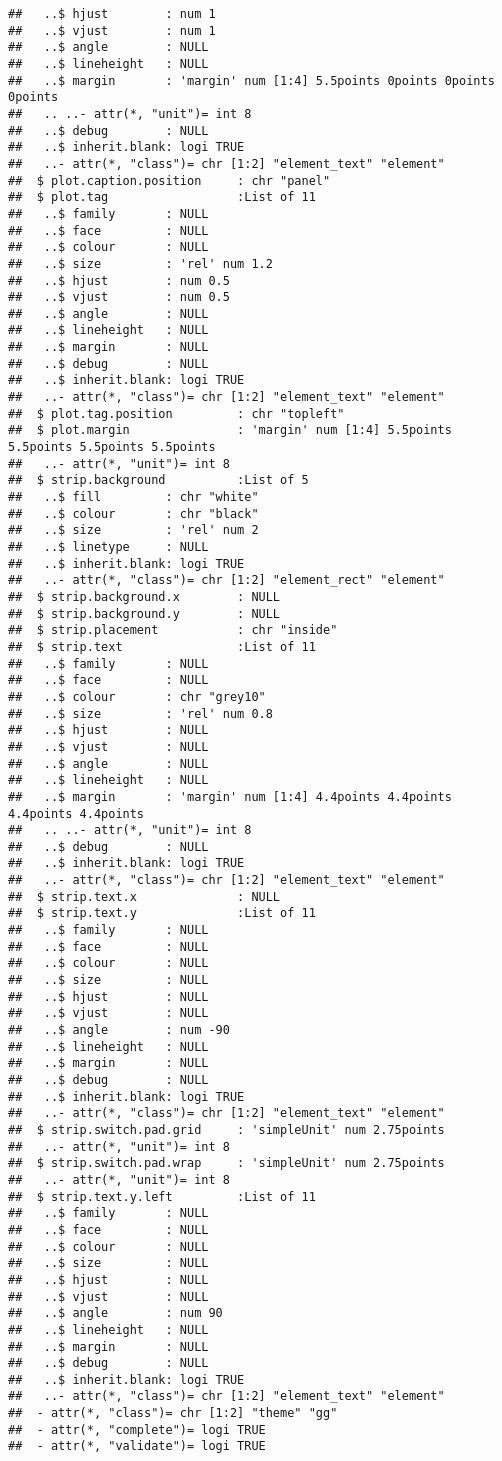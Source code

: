 \documentclass[
]{article}
\begin{document}
\begin{verbatim}
##   ..$ hjust        : num 1
##   ..$ vjust        : num 1
##   ..$ angle        : NULL
##   ..$ lineheight   : NULL
##   ..$ margin       : 'margin' num [1:4] 5.5points 0points 0points 0points
##   .. ..- attr(*, "unit")= int 8
##   ..$ debug        : NULL
##   ..$ inherit.blank: logi TRUE
##   ..- attr(*, "class")= chr [1:2] "element_text" "element"
##  $ plot.caption.position     : chr "panel"
##  $ plot.tag                  :List of 11
##   ..$ family       : NULL
##   ..$ face         : NULL
##   ..$ colour       : NULL
##   ..$ size         : 'rel' num 1.2
##   ..$ hjust        : num 0.5
##   ..$ vjust        : num 0.5
##   ..$ angle        : NULL
##   ..$ lineheight   : NULL
##   ..$ margin       : NULL
##   ..$ debug        : NULL
##   ..$ inherit.blank: logi TRUE
##   ..- attr(*, "class")= chr [1:2] "element_text" "element"
##  $ plot.tag.position         : chr "topleft"
##  $ plot.margin               : 'margin' num [1:4] 5.5points 5.5points 5.5points 5.5points
##   ..- attr(*, "unit")= int 8
##  $ strip.background          :List of 5
##   ..$ fill         : chr "white"
##   ..$ colour       : chr "black"
##   ..$ size         : 'rel' num 2
##   ..$ linetype     : NULL
##   ..$ inherit.blank: logi TRUE
##   ..- attr(*, "class")= chr [1:2] "element_rect" "element"
##  $ strip.background.x        : NULL
##  $ strip.background.y        : NULL
##  $ strip.placement           : chr "inside"
##  $ strip.text                :List of 11
##   ..$ family       : NULL
##   ..$ face         : NULL
##   ..$ colour       : chr "grey10"
##   ..$ size         : 'rel' num 0.8
##   ..$ hjust        : NULL
##   ..$ vjust        : NULL
##   ..$ angle        : NULL
##   ..$ lineheight   : NULL
##   ..$ margin       : 'margin' num [1:4] 4.4points 4.4points 4.4points 4.4points
##   .. ..- attr(*, "unit")= int 8
##   ..$ debug        : NULL
##   ..$ inherit.blank: logi TRUE
##   ..- attr(*, "class")= chr [1:2] "element_text" "element"
##  $ strip.text.x              : NULL
##  $ strip.text.y              :List of 11
##   ..$ family       : NULL
##   ..$ face         : NULL
##   ..$ colour       : NULL
##   ..$ size         : NULL
##   ..$ hjust        : NULL
##   ..$ vjust        : NULL
##   ..$ angle        : num -90
##   ..$ lineheight   : NULL
##   ..$ margin       : NULL
##   ..$ debug        : NULL
##   ..$ inherit.blank: logi TRUE
##   ..- attr(*, "class")= chr [1:2] "element_text" "element"
##  $ strip.switch.pad.grid     : 'simpleUnit' num 2.75points
##   ..- attr(*, "unit")= int 8
##  $ strip.switch.pad.wrap     : 'simpleUnit' num 2.75points
##   ..- attr(*, "unit")= int 8
##  $ strip.text.y.left         :List of 11
##   ..$ family       : NULL
##   ..$ face         : NULL
##   ..$ colour       : NULL
##   ..$ size         : NULL
##   ..$ hjust        : NULL
##   ..$ vjust        : NULL
##   ..$ angle        : num 90
##   ..$ lineheight   : NULL
##   ..$ margin       : NULL
##   ..$ debug        : NULL
##   ..$ inherit.blank: logi TRUE
##   ..- attr(*, "class")= chr [1:2] "element_text" "element"
##  - attr(*, "class")= chr [1:2] "theme" "gg"
##  - attr(*, "complete")= logi TRUE
##  - attr(*, "validate")= logi TRUE
\end{verbatim}
\end{document}
